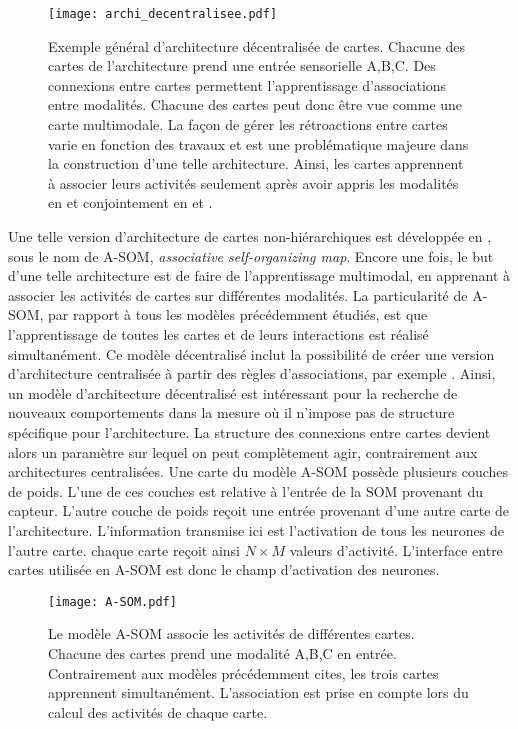 \documentclass[../main]{subfiles}
\begin{document}
\begin{figure}
    \texttt{[image: archi\_decentralisee.pdf]}
    \caption{Exemple général d'architecture décentralisée de cartes. Chacune des cartes de l'architecture prend une entrée sensorielle A,B,C. Des connexions entre cartes permettent l'apprentissage d'associations entre modalités. Chacune des cartes peut donc être vue comme une carte multimodale. La façon de gérer les rétroactions entre cartes varie en fonction des travaux et est une problématique majeure dans la construction d'une telle architecture. Ainsi, les cartes apprennent à associer leurs activités seulement après avoir appris les modalités en \cite{khacef_brain-inspired_2020} et conjointement en \cite{johnsson_associative_2009} et \cite{baheux_towards_2014}.\label{fig:archi_decentralisee}}
\end{figure}

Une telle version d'architecture de cartes non-hiérarchiques est développée en \cite{johnsson_associating_2008,johnsson_associative_2009}, sous le nom de A-SOM, \emph{associative self-organizing map}. Encore une fois, le but d'une telle architecture est de faire de l'apprentissage multimodal, en apprenant à associer les activités de cartes sur différentes modalités. La particularité de A-SOM, par rapport à tous les modèles précédemment étudiés, est que l'apprentissage de toutes les cartes et de leurs interactions est réalisé simultanément. Ce modèle décentralisé inclut la possibilité de créer une version d'architecture centralisée à partir des règles d'associations, par exemple \cite{buonamente_hierarchies_2016}. Ainsi, un modèle d'architecture décentralisé est intéressant pour la recherche de nouveaux comportements dans la mesure où il n'impose pas de structure spécifique pour l'architecture. La structure des connexions entre cartes devient alors un paramètre sur lequel on peut complètement agir, contrairement aux architectures centralisées.
Une carte du modèle A-SOM possède plusieurs couches de poids. L'une de ces couches est relative à l'entrée de la SOM provenant du capteur. L'autre couche de poids reçoit une entrée provenant d'une autre carte de l'architecture. L'information transmise ici est l'activation de tous les neurones de l'autre carte. chaque carte reçoit ainsi $N\times M$ valeurs d'activité. L'interface entre cartes utilisée en A-SOM est donc le champ d'activation des neurones.

\begin{figure}
    \centering\texttt{[image: A-SOM.pdf]}
    \caption{Le modèle A-SOM \cite{johnsson_associative_2009} associe les activités de différentes cartes. Chacune des cartes prend une modalité A,B,C en entrée. Contrairement aux modèles précédemment cites, les trois cartes apprennent simultanément. L'association est prise en compte lors du calcul des activités de chaque carte.\label{fig:asom}}
\end{figure}
\end{document}
